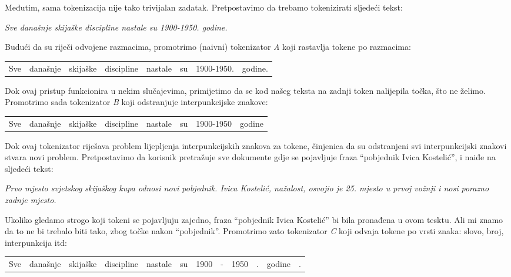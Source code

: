 \documentclass[a4paper,twoside,12pt]{scrreprt}
\newenvironment{nscenter}
 {\par\nopagebreak\centering}
 {\parskip=0pt\par\noindent\ignorespacesafterend}
\begin{document}
Međutim, sama tokenizacija nije tako trivijalan zadatak. Pretpostavimo da trebamo tokenizirati sljedeći tekst:

\begin{quoting}
  \textit{Sve današnje skijaške discipline nastale su 1900-1950. godine.}
\end{quoting}

Budući da su riječi odvojene razmacima, promotrimo (naivni) tokenizator \textit{A} koji rastavlja tokene po razmacima:

\begin{nscenter}
  \begin{tabular}{|c|c|c|c|c|c|c|c|}
    Sve & današnje & skijaške & discipline & nastale & su & 1900-1950. & godine.
  \end{tabular}
\end{nscenter}

Dok ovaj pristup funkcionira u nekim slučajevima, primijetimo da se kod našeg teksta na zadnji token nalijepila točka, što ne želimo. Promotrimo sada tokenizator \textit{B} koji odstranjuje interpunkcijske znakove:

\begin{nscenter}
  \begin{tabular}{|c|c|c|c|c|c|c|c|}
    Sve & današnje & skijaške & discipline & nastale & su & 1900-1950 & godine
  \end{tabular}
\end{nscenter}

Dok ovaj tokenizator riješava problem lijepljenja interpunkcijskih znakova za tokene, činjenica da su odstranjeni svi interpunkcijski znakovi stvara novi problem. Pretpostavimo da korisnik pretražuje sve dokumente gdje se pojavljuje fraza ``pobjednik Ivica Kostelić'', i naiđe na sljedeći tekst:

\begin{quoting}
  \textit{Prvo mjesto svjetskog skijaškog kupa odnosi novi pobjednik. Ivica Kostelić, nažalost, osvojio je 25. mjesto u prvoj vožnji i nosi porazno zadnje mjesto.}
\end{quoting}

Ukoliko gledamo strogo koji tokeni se pojavljuju zajedno, fraza ``pobjednik Ivica Kostelić'' bi bila pronađena u ovom tesktu. Ali mi znamo da to ne bi trebalo biti tako, zbog točke nakon ``pobjednik''. Promotrimo zato tokenizator \textit{C} koji odvaja tokene po vrsti znaka: slovo, broj, interpunkcija itd:

\begin{nscenter}
  \begin{tabular}{|c|c|c|c|c|c|c|c|c|c|c|c|}
    Sve & današnje & skijaške & discipline & nastale & su & 1900 & - & 1950 & . & godine & .
  \end{tabular}
\end{nscenter}
\end{document}
